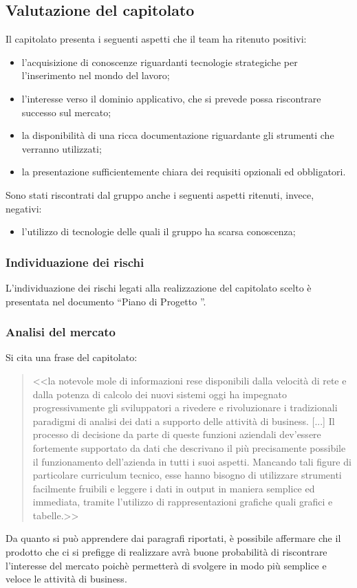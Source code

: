 	\subsection{Valutazione del capitolato} 
		Il capitolato presenta i seguenti aspetti che il team ha ritenuto positivi:
		\begin{itemize}
			\item l'acquisizione di conoscenze riguardanti tecnologie strategiche per l'inserimento nel mondo del lavoro;
			\item l'interesse verso il dominio applicativo, che si prevede possa riscontrare successo sul mercato;
			\item la disponibilità di una ricca documentazione riguardante gli strumenti che verranno utilizzati;
			\item la presentazione sufficientemente chiara dei requisiti opzionali ed obbligatori.
		\end{itemize}
		Sono stati riscontrati dal gruppo anche i seguenti aspetti ritenuti, invece, negativi:
		\begin{itemize}
			\item l'utilizzo di tecnologie delle quali il gruppo ha scarsa conoscenza;
		\end{itemize}
		\subsubsection{Individuazione dei rischi}
			L'individuazione dei rischi legati alla realizzazione del capitolato scelto è presentata nel documento
			``Piano di Progetto \lastversion''.
		\subsubsection{Analisi del mercato}
			Si cita una frase del capitolato:
			\begin{quotation}
				<<la notevole mole di informazioni rese disponibili dalla velocità di rete e dalla potenza di calcolo dei nuovi sistemi oggi ha impegnato progressivamente gli sviluppatori a rivedere e rivoluzionare i tradizionali paradigmi di analisi dei dati a supporto delle attività di business. [...]
				Il processo di decisione da parte di queste funzioni aziendali dev’essere fortemente supportato da dati che descrivano il più precisamente possibile il funzionamento dell’azienda in tutti i suoi aspetti. Mancando tali figure di particolare curriculum tecnico, esse hanno bisogno di utilizzare strumenti facilmente fruibili e leggere i dati in output in maniera semplice ed immediata, tramite l’utilizzo di rappresentazioni grafiche quali grafici e tabelle.>>
			\end{quotation}
			Da quanto si può apprendere dai paragrafi riportati, è possibile affermare che il prodotto che ci si prefigge di realizzare avrà buone probabilità di riscontrare l'interesse del mercato poichè permetterà di svolgere in modo più semplice e veloce le attività di business.
